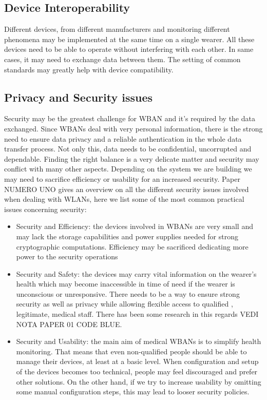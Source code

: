 \documentclass[conference]{IEEEtran}
\begin{document}
\subsection {Device Interoperability}
Different devices, from different manufacturers and monitoring different phenomena may be implemented at the same time on a single wearer. All these devices need to be able to operate without interfering with each other. In same cases, it may need to exchange data between them. The setting of common standards may greatly help with device compatibility. 

\subsection {Privacy and Security issues}
	Security may be the greatest challenge for WBAN and it’s required by the data exchanged. Since WBANs deal with very personal information, there is the strong need to ensure data privacy and a reliable authentication in the whole data transfer process. Not only this, data needs to be confidential, uncorrupted and dependable. Finding the right balance is a very delicate matter and security may conflict with many other aspects. Depending on the system we are building we may need to sacrifice efficiency or usability for an increased security. Paper NUMERO UNO gives an overview on all the different security issues involved when dealing with WLANs, here we list some of the most common practical issues concerning security:
		\begin{itemize}
			\item Security and Efficiency: the devices involved in WBANs are very small and may lack the storage capabilities and power supplies needed for strong cryptographic computations. Efficiency may be sacrificed dedicating more power to the security operations
			\item  Security and Safety: the devices may carry vital information on the wearer’s health which may become inaccessible in time of need if the wearer is unconscious or unresponsive. There needs to be a way to ensure strong security as well as privacy while allowing flexible access to qualified , legitimate, medical staff. There has been some research in this regards VEDI NOTA PAPER 01 CODE BLUE.
			\item Security and Usability: the main aim of medical WBANs is to simplify health monitoring. That means that even non-qualified people should be able to manage their devices, at least at a basic level. When configuration and setup of the devices becomes too technical, people may feel discouraged and prefer other solutions. On the other hand, if we try to increase usability by omitting some manual configuration steps, this may lead to looser security policies.
		\end{itemize}
\end{document}
